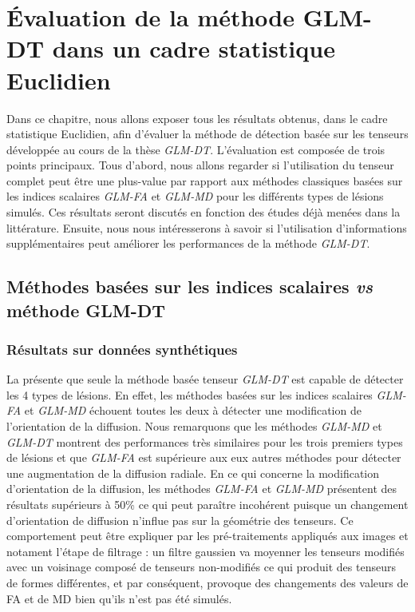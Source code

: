 
\chapter{Évaluation de la méthode GLM-DT dans un cadre statistique Euclidien}
\label{Chapter8}

Dans ce chapitre, nous allons exposer tous les résultats obtenus, dans le cadre statistique Euclidien,
afin d'évaluer la méthode de détection basée sur les tenseurs développée au cours de la thèse \textit{GLM-DT}.
L'évaluation est composée de trois points principaux.
Tous d'abord, nous allons regarder si l'utilisation du tenseur complet peut être une plus-value 
par rapport aux méthodes classiques basées sur les indices scalaires \textit{GLM-FA} et \textit{GLM-MD}
pour les différents types de lésions simulés.
Ces résultats seront discutés en fonction des études déjà menées dans la littérature.
Ensuite, nous nous intéresserons à savoir si l'utilisation d'informations supplémentaires peut améliorer les performances 
de la méthode \textit{GLM-DT}.\\





\section{Méthodes basées sur les indices scalaires \textit{vs}\\ méthode GLM-DT}

\subsection{Résultats sur données synthétiques}
La  présente que seule la méthode basée tenseur \textit{GLM-DT} est capable de détecter les 4 types de lésions.
En effet, les méthodes basées sur les indices scalaires \textit{GLM-FA} et \textit{GLM-MD} échouent toutes les deux à détecter une modification de l'orientation de la diffusion.
Nous remarquons que les méthodes \textit{GLM-MD} et \textit{GLM-DT} montrent des performances très similaires pour les trois premiers types de lésions 
et que \textit{GLM-FA} est supérieure aux eux autres méthodes pour détecter une augmentation de la diffusion radiale.
En ce qui concerne la modification d'orientation de la diffusion, les méthodes \textit{GLM-FA} et \textit{GLM-MD} présentent des résultats supérieurs à 50\% 
ce qui peut paraître incohérent puisque un changement d'orientation de diffusion n'influe pas sur la géométrie des tenseurs.
Ce comportement peut être expliquer par les pré-traitements appliqués aux images et notament l'étape de filtrage : 
un filtre gaussien va moyenner les tenseurs modifiés avec un voisinage composé de tenseurs non-modifiés ce qui produit des tenseurs de formes différentes, 
et par conséquent, provoque des changements des valeurs de FA et de MD bien qu'ils n'est pas été simulés.

